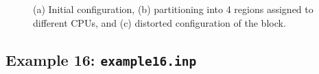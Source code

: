 \documentclass[oneside,11pt,times]{book}
\begin{document}
\begin{figure}[H]
  \begin{center}
      \quad
    \caption{(a) Initial configuration, (b) partitioning into 4 regions assigned to different CPUs, and (c) distorted configuration of the block.}
    \label{ex15}
  \end{center}
\end{figure}

\newpage
\subsection{Example 16: \texttt{example16.inp}}
\end{document}
